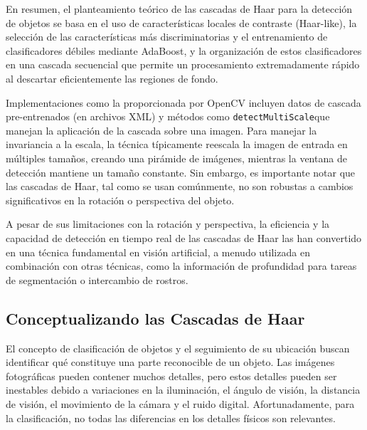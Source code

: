 \documentclass[a4paper]{article}
\begin{document}
\begin{enumerate}
\end{enumerate}

En resumen, el planteamiento teórico de las cascadas de Haar para la detección de objetos se basa en el uso de características locales de contraste (Haar-like), la selección de las características más discriminatorias y el entrenamiento de clasificadores débiles mediante AdaBoost, y la organización de estos clasificadores en una cascada secuencial que permite un procesamiento extremadamente rápido al descartar eficientemente las regiones de fondo.

Implementaciones como la proporcionada por OpenCV incluyen datos de cascada pre-entrenados (en archivos XML) y métodos como \texttt{detectMultiScale}que manejan la aplicación de la cascada sobre una imagen. Para manejar la invariancia a la escala, la técnica típicamente reescala la imagen de entrada en múltiples tamaños, creando una pirámide de imágenes, mientras la ventana de detección mantiene un tamaño constante. Sin embargo, es importante notar que las cascadas de Haar, tal como se usan comúnmente, no son robustas a cambios significativos en la rotación o perspectiva del objeto.

A pesar de sus limitaciones con la rotación y perspectiva, la eficiencia y la capacidad de detección en tiempo real de las cascadas de Haar las han convertido en una técnica fundamental en visión artificial, a menudo utilizada en combinación con otras técnicas, como la información de profundidad para tareas de segmentación o intercambio de rostros.



\subsection{Conceptualizando las Cascadas de Haar}

El concepto de clasificación de objetos y el seguimiento de su ubicación buscan identificar qué constituye una parte reconocible de un objeto. Las imágenes fotográficas pueden contener muchos detalles, pero estos detalles pueden ser inestables debido a variaciones en la iluminación, el ángulo de visión, la distancia de visión, el movimiento de la cámara y el ruido digital. Afortunadamente, para la clasificación, no todas las diferencias en los detalles físicos son relevantes.
\end{document}
